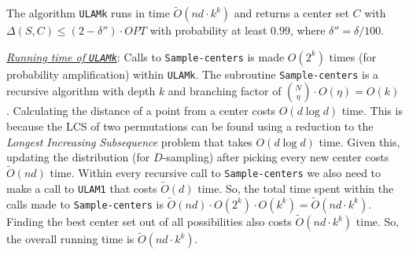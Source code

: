 \documentclass[11pt]{llncs}
\begin{document}
\begin{theorem}\label{thm:main-ulamk}
The algorithm {\tt ULAMk} runs in time $\tilde{O}(nd \cdot k^k)$ and returns a center set $C$ with $\Delta(S, C) \leq (2-\delta'') \cdot OPT$ with probability at least $0.99$, where $\delta'' = \delta/100$.
\end{theorem}
\underline{\it Running time of {\tt ULAMk}}: Calls to {\tt Sample-centers} is made $O(2^k)$ times (for probability amplification) within {\tt ULAMk}. The subroutine {\tt Sample-centers} is a recursive algorithm with depth $k$ and branching factor of $\binom{N}{\eta} \cdot O(\eta) = O(k)$.
Calculating the distance of a point from a center costs $O(d \log{d})$ time.
This is because the LCS of two permutations can be found using a reduction to the {\em Longest Increasing Subsequence} problem that takes $O(d \log{d})$ time.
Given this, updating the distribution (for $D$-sampling) after picking every new center costs $\tilde{O}(nd)$ time.
Within every recursive call to {\tt Sample-centers} we also need to make a call to {\tt ULAM1} that costs $\tilde{O}(d)$ time.
So, the total time spent within the calls made to {\tt Sample-centers} is $\tilde{O}(nd) \cdot O(2^k) \cdot O\left( k^k\right) = \tilde{O}(nd \cdot k^k)$.
Finding the best center set out of all possibilities also costs $\tilde{O}(nd \cdot k^k)$ time.
So, the overall running time is $\tilde{O}(nd \cdot k^k)$.
\end{document}
